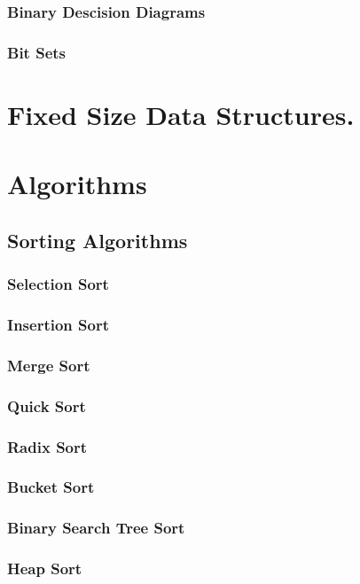 \documentclass[12pt, letterpaper]{book}
\begin{document}
\section{Binary Descision Diagrams} \label{bdds}
\section{Bit Sets}

\part{Fixed Size Data Structures.}

\part{Algorithms}

	\chapter{Sorting Algorithms}

		\section{Selection Sort}
		\section{Insertion Sort}
		\section{Merge Sort}
		\section{Quick Sort}
		\section{Radix Sort}
		\section{Bucket Sort}
		\section{Binary Search Tree Sort}
		\section{Heap Sort}
\end{document}
